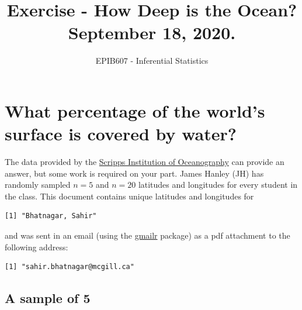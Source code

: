 \documentclass[letterpaper,10pt,twoside,]{pinp}
\title{Exercise - How Deep is the Ocean? September 18, 2020.}
\author[a]{EPIB607 - Inferential Statistics}
\affil[a]{Fall 2020, McGill University}
\begin{document}
\verticaladjustment{-2pt}

\maketitle
\thispagestyle{firststyle}



\hypertarget{what-percentage-of-the-worlds-surface-is-covered-by-water}{%
\section{What percentage of the world's surface is covered by
water?}\label{what-percentage-of-the-worlds-surface-is-covered-by-water}}

The data provided by the
\href{https://topex.ucsd.edu/cgi-bin/get_srtm30.cgi}{Scripps Institution
of Oceanography} can provide an answer, but some work is required on
your part. James Hanley (JH) has randomly sampled \(n=5\) and \(n=20\)
latitudes and longitudes for every student in the class. This document
contains unique latitudes and longitudes for

\begin{ShadedResult}
\begin{verbatim}
[1] "Bhatnagar, Sahir"
\end{verbatim}
\end{ShadedResult}

and was sent in an email (using the
\href{https://cran.r-project.org/package=gmailr}{gmailr} package) as a
pdf attachment to the following address:

\begin{ShadedResult}
\begin{verbatim}
[1] "sahir.bhatnagar@mcgill.ca"
\end{verbatim}
\end{ShadedResult}

\hypertarget{a-sample-of-5}{%
\subsection*{A sample of 5}\label{a-sample-of-5}}
\end{document}
